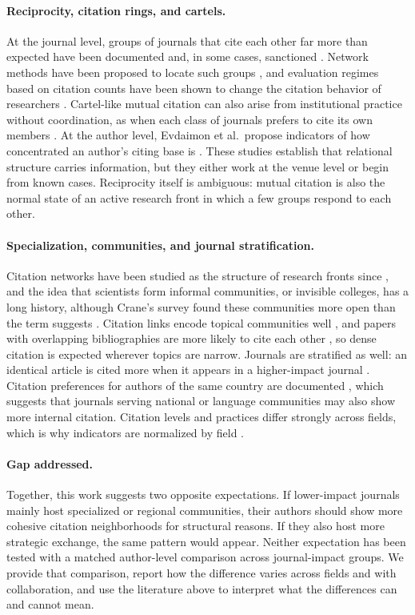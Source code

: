 \documentclass[12pt]{article}
\begin{document}
\paragraph{Reciprocity, citation rings, and cartels.}  At the journal level, groups of journals that cite each other far more than expected have been documented and, in some cases, sanctioned \parencite{heneberg2016,Kojaku2021}.  Network methods have been proposed to locate such groups \parencite{Fister2016}, and evaluation regimes based on citation counts have been shown to change the citation behavior of researchers \parencite{Baccini2019}.  Cartel-like mutual citation can also arise from institutional practice without coordination, as when each class of journals prefers to cite its own members \parencite{Perez2019}.  At the author level, Evdaimon et al.\ propose indicators of how concentrated an author's citing base is \parencite{Evdaimon2024}.  These studies establish that relational structure carries information, but they either work at the venue level or begin from known cases.  Reciprocity itself is ambiguous: mutual citation is also the normal state of an active research front in which a few groups respond to each other.

\paragraph{Specialization, communities, and journal stratification.}  Citation networks have been studied as the structure of research fronts since \textcite{Price1965}, and the idea that scientists form informal communities, or invisible colleges, has a long history, although Crane's survey found these communities more open than the term suggests \parencite{Crane1969}.  Citation links encode topical communities well \parencite{Boyack2010}, and papers with overlapping bibliographies are more likely to cite each other \parencite{Ciotti2016}, so dense citation is expected wherever topics are narrow.  Journals are stratified as well: an identical article is cited more when it appears in a higher-impact journal \parencite{Lariviere2010}.  Citation preferences for authors of the same country are documented \parencite{Qiu2025,Baccini2023}, which suggests that journals serving national or language communities may also show more internal citation.  Citation levels and practices differ strongly across fields, which is why indicators are normalized by field \parencite{Waltman2016}.

\paragraph{Gap addressed.}  Together, this work suggests two opposite expectations.  If lower-impact journals mainly host specialized or regional communities, their authors should show more cohesive citation neighborhoods for structural reasons.  If they also host more strategic exchange, the same pattern would appear.  Neither expectation has been tested with a matched author-level comparison across journal-impact groups.  We provide that comparison, report how the difference varies across fields and with collaboration, and use the literature above to interpret what the differences can and cannot mean.
\end{document}
